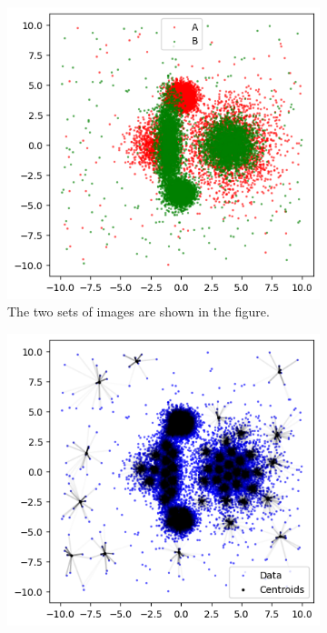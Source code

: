 \newpage
\begin{figure}[H]
	\centering
	\begin{subfigure}{0.45\linewidth}
		\includegraphics[width=\linewidth]{Figures/fused_data_2D_fcm.png}
		\caption[Application of fcm distance - fused data]{The two sets of images are shown in the figure. \vspace{3.50em}}
		\label{fig:fused_data_2D_fcm}
	\end{subfigure}
	\hfill
	\begin{subfigure}{0.45\linewidth}
		\includegraphics[width=\linewidth]{Figures/fcm_2D_fcm.png}

\end{subfigure}
\end{figure}
